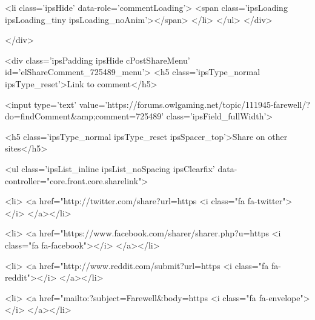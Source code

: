 						
						
					
					<li class='ipsHide' data-role='commentLoading'>
						<span class='ipsLoading ipsLoading_tiny ipsLoading_noAnim'></span>
					</li>
				</ul>
			</div>
		

		
			

		
	</div>

	

	



<div class='ipsPadding ipsHide cPostShareMenu' id='elShareComment_725489_menu'>
	<h5 class='ipsType_normal ipsType_reset'>Link to comment</h5>
	
		
	
	
	<input type='text' value='https://forums.owlgaming.net/topic/111945-farewell/?do=findComment&amp;comment=725489' class='ipsField_fullWidth'>

	
	<h5 class='ipsType_normal ipsType_reset ipsSpacer_top'>Share on other sites</h5>
	

	<ul class='ipsList_inline ipsList_noSpacing ipsClearfix' data-controller="core.front.core.sharelink">
		
			<li>
<a href="http://twitter.com/share?url=https%
	<i class="fa fa-twitter"></i>
</a></li>
		
			<li>
<a href="https://www.facebook.com/sharer/sharer.php?u=https%
	<i class="fa fa-facebook"></i>
</a></li>
		
			<li>
<a href="http://www.reddit.com/submit?url=https%
	<i class="fa fa-reddit"></i>
</a></li>
		
			<li>
<a href="mailto:?subject=Farewell&body=https%
	<i class="fa fa-envelope"></i>
</a></li>
		
